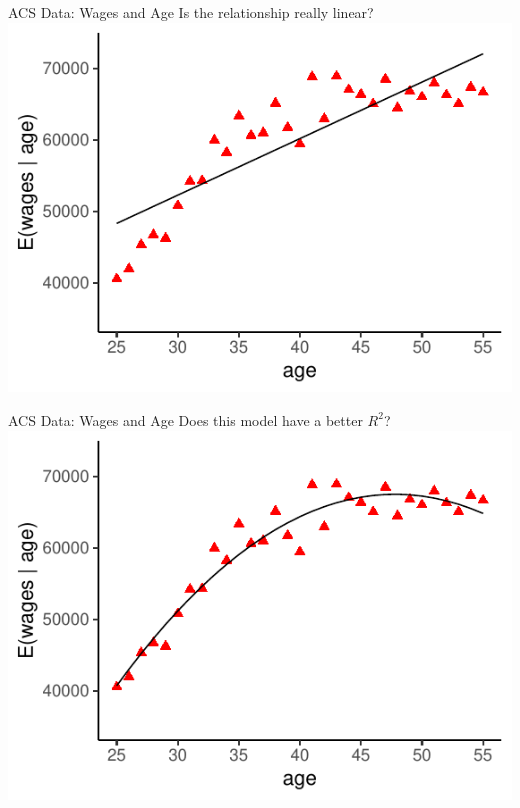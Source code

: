 \documentclass{./../div_teaching_slides}
\begin{document}
\begin{frame}{ACS Data: Wages and Age}
\vspace{-0.5em}
\centering Is the relationship really linear? \\ \vspace{0.5em}
\includegraphics{./../../output/scatter_age_wage_lfit.pdf}
\end{frame}

\begin{frame}{ACS Data: Wages and Age}
\vspace{-0.5em}
\centering Does this model have a better $R^2$? \\ \vspace{0.5em}
\includegraphics{./../../output/scatter_age_wage_qfit.pdf}
\end{frame}
\end{document}
